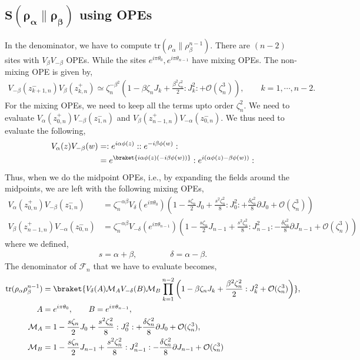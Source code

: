 \documentclass[11pt]{article}
\newcommand{\p}{\partial}
\newcommand{\mO}{\mathcal{O}}
\newcommand{\lb}{\left(}
\newcommand{\rb}{\right)}
\begin{document}
\subsection{\texorpdfstring{$\boldsymbol{S(\rho_\alpha \| \rho_\beta)}$ using OPEs}{S(rho alpha rho beta) using OPEs}}
In the denominator, we have to compute $\text{tr}(\rho_\alpha\| \rho_\beta^{n-1})$. There are $(n-2)$ sites with $V_\beta V_{-\beta}$ OPEs. While the sites $e^{i\pi\theta_0}, e^{i\pi\theta_{n-1}}$ have mixing OPEs. The non-mixing OPE is given by,
\begin{align}
    V_{-\beta} (z_{k+1,n}^-)V_{\beta}(z_{k,n}^+) \simeq  \zeta_n^{-\beta^2}\lb 1- \beta \zeta_n J_k + \frac{\beta^2\zeta_n^2}{2}:J_k^2: + \mO(\zeta_n^3)  \rb, \qquad k = 1, \cdots, n-2.
\end{align}
For the mixing OPEs, we need to keep all the terms upto order $\zeta_n^2$. We need to evaluate $V_\alpha(z_{0,n}^+)V_{-\beta}(z_{1,n}^-)$ and $V_\beta(z_{n-1,n}^+)V_{-\alpha}(z_{0,n}^-)$. We thus need to evaluate the following,
\begin{align}
    V_\alpha(z)V_{-\beta}(w) &= :e^{i\alpha \phi(z)}::e^{-i\beta \phi(w)}: \\
    &= e^{\braket{i\alpha \phi(z) (-i\beta \phi(w))}}:e^{i(\alpha \phi(z) - \beta \phi(w))}:
\end{align}
Thus, when we do the midpoint OPEs, i.e., by expanding the fields around the midpoints, we are left with the following mixing OPEs,
\begin{align}
    V_\alpha(z_{0,n}^+)V_{-\beta}(z_{1,n}^-) &= \zeta_n^{-\alpha\beta} V_{\delta}(e^{i\pi \theta_0}) \lb 1 -\frac{ s\zeta_n}{2} J_0 + \frac{s^2\zeta_n^2}{8}:J_0^2: + \frac{\delta \zeta_n^2}{8}\p J_0 + \mO(\zeta_n^3)\rb \\
    V_\beta(z_{n-1,n}^+)V_{-\alpha}(z_{0,n}^-) &= \zeta_n^{-\alpha\beta} V_{-\delta}(e^{i\pi \theta_{n-1}}) \lb 1 - \frac{s\zeta_n}{2} J_{n-1} + \frac{s^2\zeta_n^2}{8}:J_{n-1}^2: - \frac{\delta \zeta_n^2}{8}\p J_{n-1} + \mO(\zeta_n^3)\rb
\end{align}
where we defined,
\begin{align}
    s = \alpha + \beta, \qquad \qquad \delta = \alpha-\beta.
\end{align}
The denominator of $\mathcal{F}_n$ that we have to evaluate becomes,
\begin{align}
    \text{tr}(\rho_\alpha \rho_\beta^{n-1}) &= \braket{V_\delta(A)\mathcal{M}_A V_{-\delta}(B)\mathcal{M}_B \prod_{k=1}^{n-2} \lb 1- \beta \zeta_nJ_k + \frac{\beta^2 \zeta_n^2}{2}:J^2_k + \mO(\zeta_n^3)\rb }, \\
     A&= e^{i\pi\theta_0}, \qquad B = e^{i\pi \theta_{n-1}}, \\
    \mathcal{M}_A &= 1 - \frac{s\zeta_n}{2} J_0 + \frac{s^2\zeta_n^2}{8}:J_0^2: + \frac{\delta \zeta_n^2}{8}\p J_0 + \mO(\zeta_n^3), \\
    \mathcal{M}_B &= 1 - \frac{s\zeta_n}{2} J_{n-1} + \frac{s^2\zeta_n^2}{8}:J_{n-1}^2: - \frac{\delta \zeta_n^2}{8}\p J_{n-1} + \mO(\zeta_n^3)
\end{align}
\end{document}
